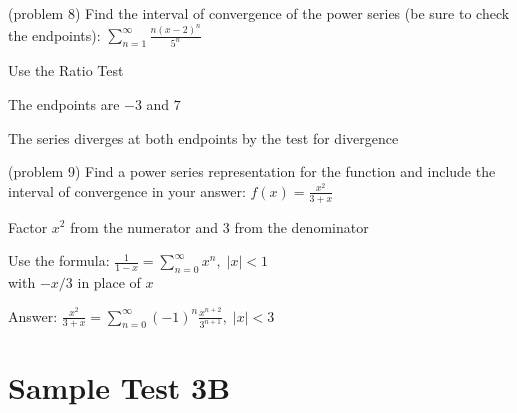 \documentclass[handout]{ximera}
\begin{document}
\begin{problem} (problem 8)
Find the interval of convergence of the power series (be sure to check the endpoints):
$\displaystyle \sum_{n=1}^\infty \frac{n(x-2)^n}{5^n}$

\begin{hint}
Use the Ratio Test
\end{hint}
\begin{hint}
The endpoints are $-3$ and $7$
\end{hint}
\begin{hint}
The series diverges at both endpoints by the test for divergence
\end{hint}

\end{problem}


\begin{problem} (problem 9)
Find a power series representation for the function and include the interval of convergence in your answer:
$\displaystyle f(x) = \frac{x^2}{3 + x}$

\begin{hint}
Factor $x^2$ from the numerator and $3$ from the denominator
\end{hint}
\begin{hint}
Use the formula: $\displaystyle \frac{1}{1-x} = \sum_{n = 0}^\infty x^n, \; |x| <1$\\
with $-x/3$ in place of $x$
\end{hint}
\begin{hint}
Answer: 
$\displaystyle \frac{x^2}{3 + x} = \sum_{n = 0}^\infty (-1)^n \frac{x^{n+2}}{3^{n+1}}, \; |x| <3$
\end{hint}
\end{problem}


\section{Sample Test 3B}





\end{document}
